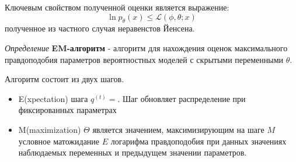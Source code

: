 Ключевым свойством полученной оценки является выражение:
$$
    \ln p_\theta(x) \le \mathcal{L}(\phi,\theta;x)
$$
полученное из частного случая неравенстов Йенсена.


\textit{Определение} \textbf{EM-алгоритм} - алгоритм для нахождения оценок
максимального правдоподобия параметров  вероятностных моделей с скрытыми переменными $\theta$.

Алгоритм состоит из двух шагов. \begin{itemize}
    \item E(xpectation) шага $q^{(t)} = $. Шаг 
    обновляет распределение при фиксированных параметрах
    \item M(maximization) $\Theta$ является значением, 
    максимизирующим на шаге $M$ условное матожидание $E$ логарифма правдоподобия при данных значениях наблюдаемых переменных и предыдущем значении параметров.  
\end{itemize}

